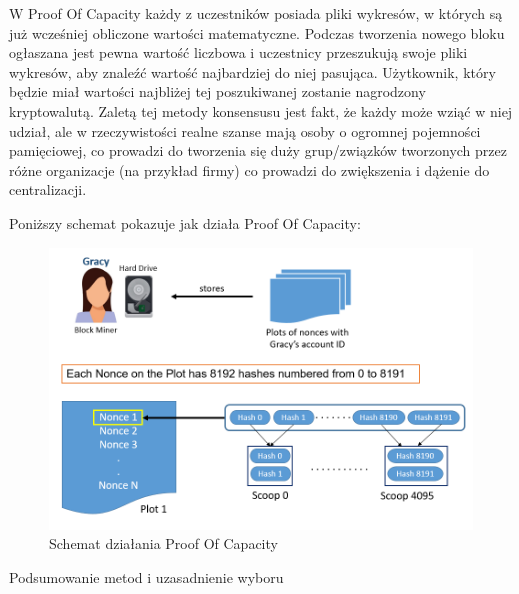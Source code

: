 \vspace{1em}

W Proof Of Capacity każdy z uczestników posiada pliki wykresów, w których są już wcześniej obliczone wartości matematyczne. Podczas tworzenia nowego bloku ogłaszana jest pewna wartość liczbowa i uczestnicy przeszukują swoje pliki wykresów, aby znaleźć wartość najbardziej do niej pasująca. Użytkownik, który będzie miał wartości najbliżej tej poszukiwanej zostanie nagrodzony kryptowalutą. Zaletą tej metody konsensusu jest fakt, że każdy może wziąć w niej udział, ale w rzeczywistości realne szanse mają osoby o ogromnej pojemności pamięciowej, co prowadzi do tworzenia się duży grup/związków tworzonych przez różne organizacje (na przykład firmy) co prowadzi do zwiększenia i dążenie do centralizacji.

\vspace{1em}

Poniższy schemat pokazuje jak działa Proof Of Capacity:
\begin{figure}[H]
    \centering
    \includegraphics[width=\textwidth]{Images/ConsensusPOC.png}
    \caption{Schemat działania Proof Of Capacity}
    \label{fig:ConsensusPOC}
\end{figure}
Podsumowanie metod i uzasadnienie wyboru

\vspace{1em}

